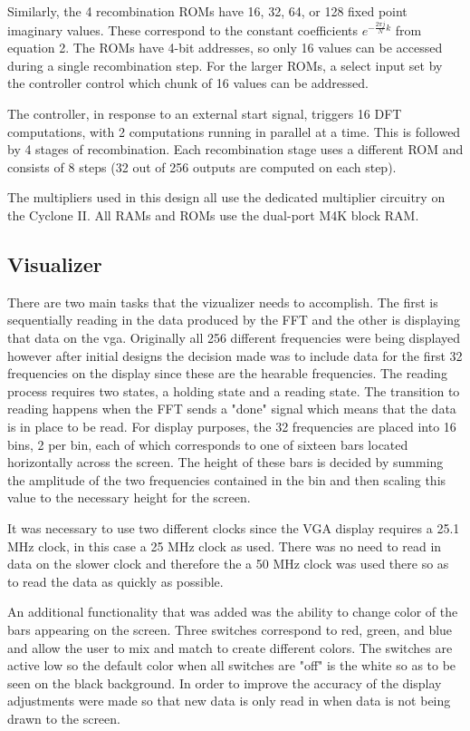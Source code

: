 \documentclass{article}
\begin{document}
Similarly, the 4 recombination ROMs have 16, 32, 64, or 128 fixed point
imaginary values. These correspond to the constant coefficients
\(e^{-\frac{2\pi j}{N}k}\) from equation 2. The ROMs have 4-bit addresses, 
so only 16 values can be accessed during a single recombination step. 
For the larger ROMs, a select input set by the controller control which 
chunk of 16 values can be addressed.

The controller, in response to an external start signal, triggers
16 DFT computations, with 2 computations running in parallel at a time.
This is followed by 4 stages of recombination. Each recombination stage
uses a different ROM and consists of 8 steps (32 out of 256 outputs are
computed on each step).

The multipliers used in this design all use the dedicated multiplier 
circuitry on the Cyclone II. All RAMs and ROMs use the dual-port M4K
block RAM.
	
\subsection{Visualizer} 

There are two main tasks that the vizualizer needs to accomplish.  
The first is sequentially reading in the data produced by the FFT and the 
other is displaying that data on the vga.  Originally all 256 different 
frequencies were being displayed however after initial designs the decision 
made was to include data for the first 32 frequencies on the display since 
these are the hearable frequencies.  The reading process requires two states, 
a holding state and a reading state.  The transition to reading happens when 
the FFT sends a "done" signal which means that the data is in place to be read.  
For display purposes, the 32 frequencies are placed into 16 bins, 2 per bin, 
each of which corresponds to one of sixteen bars located horizontally across 
the screen.  The height of these bars is decided by summing the amplitude of 
the two frequencies contained in the bin and then scaling this value to the 
necessary height for the screen.

It was necessary to use two different clocks since the VGA display requires a 25.1 MHz clock, in this case a 25 MHz clock as used.  There was no need to read in data on the slower clock and therefore the a 50 MHz clock was used there so as to read the data as quickly as possible. 

An additional functionality that was added was the ability to change color of the bars appearing on the screen.  
Three switches correspond to red, green, and blue and allow the user to mix 
and match to create different colors.  The switches are active low so the 
default color when all switches are "off" is the white so as to be seen on the 
black background.  In order to improve the accuracy of the display adjustments 
were made so that new data is only read in when data is not being drawn to the screen.
\end{document}
